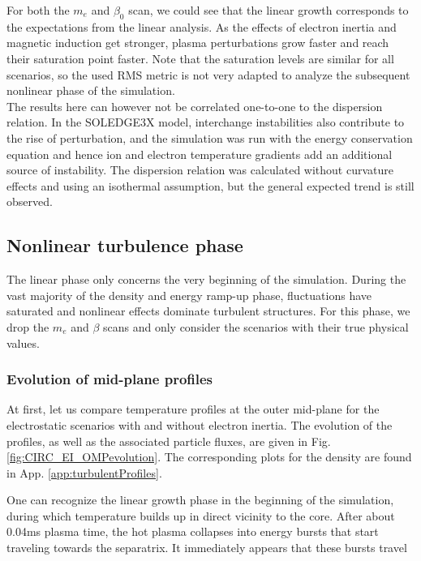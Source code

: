 For both the $m_e$ and $\beta_0$ scan, we could see that the linear growth corresponds to the expectations from the linear analysis. As the effects of electron inertia and magnetic induction get stronger, plasma perturbations grow faster and reach their saturation point faster. Note that the saturation levels are similar for all scenarios, so the used RMS metric is not very adapted to analyze the subsequent nonlinear phase of the simulation. \\

The results here can however not be correlated one-to-one to the dispersion relation. In the SOLEDGE3X model, interchange instabilities also contribute to the rise of perturbation, and the simulation was run with the energy conservation equation and hence ion and electron temperature gradients add an additional source of instability. The dispersion relation was calculated without curvature effects and using an isothermal assumption, but the general expected trend is still observed. 


\subsection{Nonlinear turbulence phase}

The linear phase only concerns the very beginning of the simulation. During the vast majority of the density and energy ramp-up phase, fluctuations have saturated and nonlinear effects dominate turbulent structures. For this phase, we drop the $m_e$ and $\beta$ scans and only consider the scenarios with their true physical values.


\subsubsection{Evolution of mid-plane profiles}

At first, let us compare temperature profiles at the outer mid-plane for the electrostatic scenarios with and without electron inertia. The evolution of the profiles, as well as the associated particle fluxes, are given in Fig. \ref{fig:CIRC_EI_OMPevolution}. The corresponding plots for the density are found in App. \ref{app:turbulentProfiles}.

One can recognize the linear growth phase in the beginning of the simulation, during which temperature builds up in direct vicinity to the core. After about 0.04ms plasma time, the hot plasma collapses into energy bursts that start traveling towards the separatrix. It immediately appears that these bursts travel 

